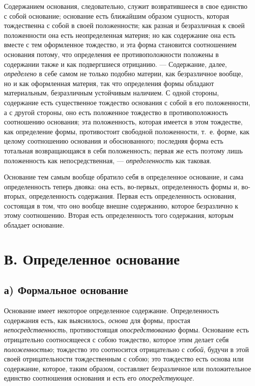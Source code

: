 Содержанием основания, следовательно, служит возвратившееся в свое единство
с собой основание; основание есть ближайшим образом сущность, которая
тождественна с собой в своей положенности; как разная и безразличная к
своей положенности она есть неопределенная материя; но как содержание она
есть вместе с тем оформленное тождество, и эта форма становится
соотношением основания потому, что определения ее противоположности
положены в содержании также и как подвергшиеся отрицанию. — Содержание,
далее, {\em определено} в себе самом не только подобно
материи, как безразличное вообще, но и как оформленная материя, так что
определения формы обладают материальным, безразличным устойчивым наличием.
С одной стороны, содержание есть существенное тождество основания с собой в
его положенности, а с другой стороны, оно есть положенное тождество в
противоположность соотношению основания; эта положенность, которая имеется
в этом тождестве, как определение формы, противостоит свободной
положенности, т.~е. форме, как целому соотношению основания и
обоснованного; последняя форма есть тотальная возвращающаяся в себя
положенность; первая же есть поэтому лишь положенность как
непосредственная, — {\em определенность} как таковая.

Основание тем самым вообще обратило себя в определенное основание, и сама
определенность теперь двояка: она есть, во-первых, определенность формы и,
во-вторых, определенность содержания. Первая есть определенность основания,
состоящая в том, что оно вообще внешне содержанию, которое безразлично к
этому соотношению. Вторая есть определенность того содержания, которым
обладает основание.


\section[В. Определенное основание]{В. Определенное основание}
\subsection[а) Формальное основание]{а) Формальное основание}

Основание имеет некоторое определенное
содержание. Определенность содержания есть, как выяснилось,
{\em основа} для формы, простая
{\em непосредственность}, противостоящая
{\em опосредствованию} формы. Основание есть
отрицательно соотносящееся с собою тождество, которое этим делает себя
{\em положенностью}; тождество это соотносится
отрицательно с {\em собой}, будучи в этой своей
отрицательности тождественным с собою; это тождество есть основа или
содержание, которое, таким образом, составляет безразличное или
положительное единство соотношения основания и есть его
{\em опосредствующее}.

